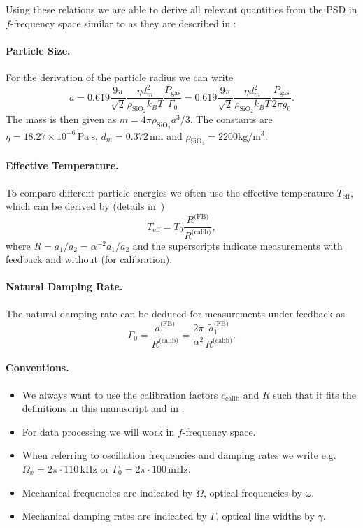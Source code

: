 \documentclass[10pt,a4paper]{article}
\begin{document}
	Using these relations we are able to derive all relevant quantities from the PSD in $f$-frequency space similar to as they are described in \cite{Gieseler2014}:
	
	\paragraph{Particle Size.}
	For the derivation of the particle radius we can write
	\begin{equation}
		a = 0.619\frac{9\pi}{\sqrt{2}}\frac{\eta d_m^2}{\rho_\mathrm{SiO_2}k_BT}\frac{P_\text{gas}}{\Gamma_0} = 0.619\frac{9\pi}{\sqrt{2}}\frac{\eta d_m^2}{\rho_\mathrm{SiO_2}k_BT}\frac{P_\text{gas}}{2\pi g_0}.
	\end{equation}
	The mass is then given as $m=4\pi\rho_\mathrm{SiO_2}a^3/3$. The constants are $\eta=18.27\times10^{-6}\,\mathrm{Pa\ s}$, $d_m=0.372\,\mathrm{nm}$ and $\rho_\mathrm{SiO_2}=2200\mathrm{kg/m^3}$.
	
	\paragraph{Effective Temperature.}
	To compare different particle energies we often use the effective temperature $T_\text{eff}$, which can be derived by (details in~\cite{Gieseler2014})
	\begin{equation}
	T_\text{eff}=T_0\frac{R^\text{(FB)}}{R^\text{(calib)}},
	\end{equation}
	where $R=a_1/a_2=\alpha^{-2}\tilde{a}_1/\tilde{a}_2$ and the superscripts indicate measurements with feedback and without (for calibration).
	
	\paragraph{Natural Damping Rate.}
	The natural damping rate can be deduced for measurements under feedback as
	\begin{equation}
		\Gamma_0=\frac{a_1^\text{(FB)}}{R^\text{(calib)}}=\frac{2\pi}{\alpha^2}\frac{\tilde{a}_1^\text{(FB)}}{R^\text{(calib)}}.
	\end{equation}
	
	\paragraph{Conventions.}
	\begin{itemize}
		\item We always want to use the calibration factors $c_\text{calib}$ and $R$ such that it fits the definitions in this manuscript and in \cite{Gieseler2014}.
		\item For data processing we will work in $f$-frequency space.
		\item When referring to oscillation frequencies and damping rates we write e.g.\ $\Omega_x=2\pi\cdot 110\,\mathrm{kHz}$ or $\Gamma_0=2\pi\cdot 100\,\mathrm{mHz}$.
		\item Mechanical frequencies are indicated by $\Omega$, optical frequencies by $\omega$.
		\item Mechanical damping rates are indicated by $\Gamma$, optical line widths by $\gamma$.
	\end{itemize}
	
	
	
\end{document}
